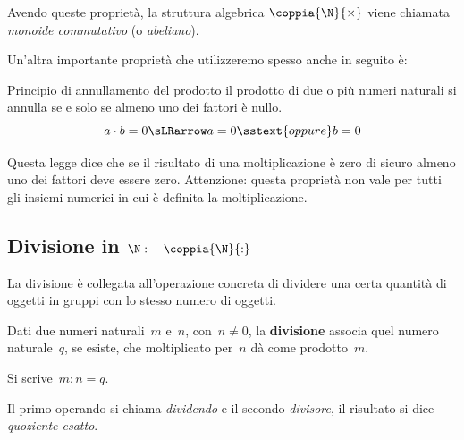 Avendo queste proprietà, la struttura algebrica 
\(\coppia{\N}{\times}\) 
\ind{\(\coppia{\N}{\times}\)} viene chiamata \emph{monoide commutativo} (o 
\emph{abeliano}).


\bigskip %
Un'altra importante proprietà che utilizzeremo spesso anche in seguito è:

\begin{postulato}{Principio di annullamento del prodotto}{}
il prodotto di due o più numeri naturali si annulla se e solo se almeno uno 
dei fattori è nullo.
\[ a \cdot b = 0 \sLRarrow a=0 \sstext{oppure} b = 0\]
\end{postulato}

Questa legge dice che se il risultato di una moltiplicazione è zero di 
sicuro almeno uno dei fattori deve essere zero. 
Attenzione: questa proprietà non vale per tutti gli insiemi numerici in 
cui è definita la moltiplicazione.

\subsection{Divisione in 
\texorpdfstring{$\N: \quad \coppia{\N}{:}$}{N: (N; :)}}

La divisione è collegata all'operazione concreta di dividere una certa
quantità di oggetti in gruppi con lo stesso numero di oggetti.

\begin{definizione}{}{}
Dati due numeri naturali~\(m\) e~\(n\), con~\(n \neq 0\), la 
\textbf{divisione} associa quel numero naturale~\(q\), se esiste, che 
moltiplicato per~\(n\) dà come prodotto~\(m\).

Si scrive~\(m : n = q\).

Il primo operando si chiama \emph{dividendo} e il secondo \emph{divisore}, 
il risultato si dice \emph{quoziente esatto}.
\end{definizione}

